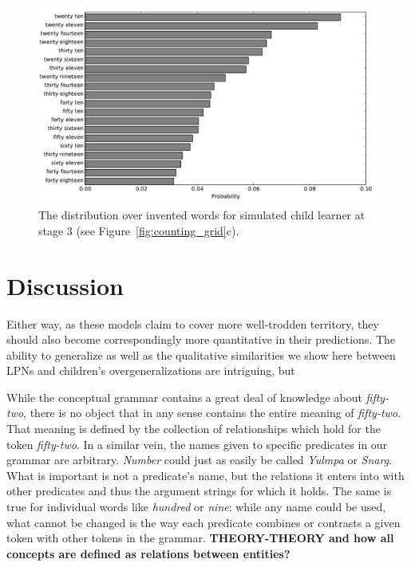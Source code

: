 \documentclass[10pt,letterpaper]{article}
\begin{document}
\begin{figure}[t]
\includegraphics[width=0.9\linewidth]{figures/inventedWords}
\caption{The distribution over invented words for simulated child
  learner at stage
  3 (see Figure~\ref{fig:counting_grid}c). \label{fig:inventedWords}}
\end{figure}


\section{Discussion}


Either way, as these models claim to cover more well-trodden
territory, they should also become correspondingly more quantitative
in their predictions. The ability to generalize as well as the
qualitative similarities we show here between LPNs and children's
overgeneralizations are intriguing, but 


While the conceptual grammar contains a great deal of knowledge about
\emph{fifty-two}, there is no object that in any sense contains the
entire meaning of \emph{fifty-two}. That meaning is defined by the
collection of relationships which hold for the token \emph{fifty-two}.
In a similar vein, the names given to specific predicates in our
grammar are arbitrary. \emph{Number} could just as easily be called
\emph{Yulmpa} or \emph{Snarg}. What is important is not a predicate's
name, but the relations it enters into with other predicates and thus
the argument strings for which it holds. The same is true for
individual words like \emph{hundred} or \emph{nine}: while any name
could be used, what cannot be changed is the way each predicate
combines or contrasts a given token with other tokens in the grammar.
{\bf THEORY-THEORY and how all concepts are defined as relations
  between entities?}
\end{document}
